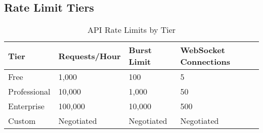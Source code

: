 \subsection{Rate Limit Tiers}

\begin{table}[H]
\centering
\caption{API Rate Limits by Tier}
\begin{tabular}{|p{3cm}|p{3cm}|p{3cm}|p{3cm}|}
\hline
\textbf{Tier} & \textbf{Requests/Hour} & \textbf{Burst Limit} & \textbf{WebSocket Connections} \\
\hline
Free & 1,000 & 100 & 5 \\
\hline
Professional & 10,000 & 1,000 & 50 \\
\hline
Enterprise & 100,000 & 10,000 & 500 \\
\hline
Custom & Negotiated & Negotiated & Negotiated \\
\hline
\end{tabular}
\end{table}